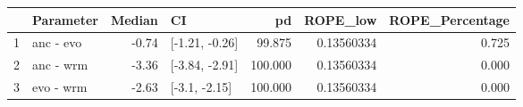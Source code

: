 \begin{table}[ht]
\centering
\begin{tabular}{llrlrrr}
  \hline
 & Parameter & Median & CI & pd & ROPE\_low & ROPE\_Percentage \\ 
  \hline
1 & anc - evo & -0.74 & [-1.21, -0.26] & 99.875 & 0.13560334 & 0.725 \\ 
  2 & anc - wrm & -3.36 & [-3.84, -2.91] & 100.000 & 0.13560334 & 0.000 \\ 
  3 & evo - wrm & -2.63 & [-3.1, -2.15] & 100.000 & 0.13560334 & 0.000 \\ 
   \hline
\end{tabular}
\end{table}

